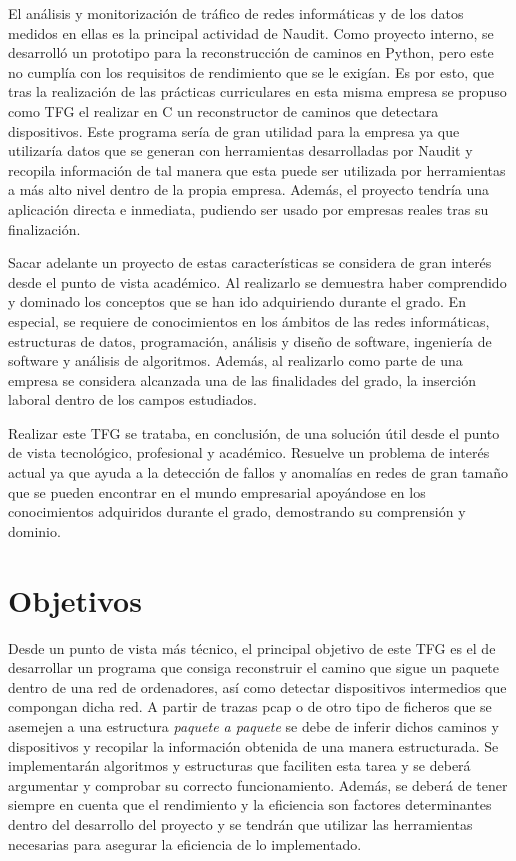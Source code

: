 \documentclass[tfg,epsbased,lof,lot,loa,covers,final,copyright,overleaf]{tfgtfmthesisuam}
\begin{document}
El análisis y monitorización de tráfico de redes informáticas y de los datos medidos en ellas es la principal actividad de Naudit. Como proyecto interno, se desarrolló un prototipo para la reconstrucción de caminos en Python, pero este no cumplía con los requisitos de rendimiento que se le exigían. Es por esto, que tras la realización de las prácticas curriculares en esta misma empresa se propuso como TFG el realizar en C un reconstructor de caminos que detectara dispositivos. Este programa sería de gran utilidad para la empresa ya que utilizaría datos que se generan con herramientas desarrolladas por Naudit y recopila información de tal manera que esta puede ser utilizada por herramientas a más alto nivel dentro de la propia empresa. Además, el proyecto tendría una aplicación directa e inmediata, pudiendo ser usado por empresas reales tras su finalización.

Sacar adelante un proyecto de estas características se considera de gran interés desde el punto de vista académico. Al realizarlo se demuestra haber comprendido y dominado los conceptos que se han ido adquiriendo durante el grado. En especial, se requiere de conocimientos en los ámbitos de las redes informáticas, estructuras de datos, programación, análisis y diseño de software, ingeniería de software y análisis de algoritmos. Además, al realizarlo como parte de una empresa se considera alcanzada una de las finalidades del grado, la inserción laboral dentro de los campos estudiados.

Realizar este TFG se trataba, en conclusión, de una solución útil desde el punto de vista tecnológico, profesional y académico. Resuelve un problema de interés actual ya que ayuda a la detección de fallos y anomalías en redes de gran tamaño que se pueden encontrar en el mundo empresarial apoyándose en los conocimientos adquiridos durante el grado, demostrando su comprensión y dominio. 
\section{Objetivos}
Desde un punto de vista más técnico, el principal objetivo de este TFG es el de desarrollar un programa que consiga reconstruir el camino que sigue un paquete dentro de una red de ordenadores, así como detectar dispositivos intermedios que compongan dicha red. A partir de trazas pcap o de otro tipo de ficheros que se asemejen a una estructura \textit{paquete a paquete} se debe de inferir dichos caminos y dispositivos y recopilar la información obtenida de una manera estructurada. Se implementarán algoritmos y estructuras que faciliten esta tarea y se deberá argumentar y comprobar su correcto funcionamiento. Además, se deberá de tener siempre en cuenta que el rendimiento y la eficiencia son factores determinantes dentro del desarrollo del proyecto y se tendrán que utilizar las herramientas necesarias para asegurar la eficiencia de lo implementado.
\end{document}
